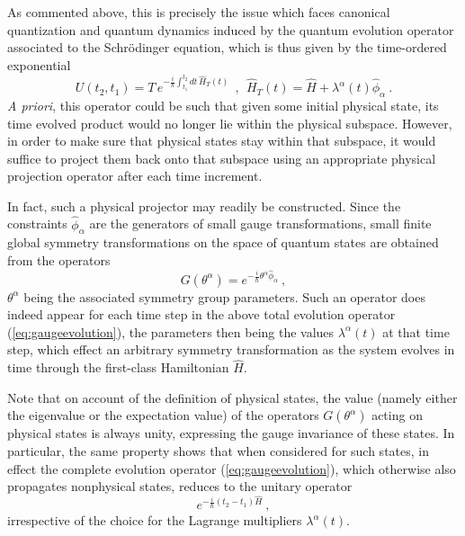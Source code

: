 \documentclass[a4paper,11pt]{article}
\begin{document}
As commented above, this is precisely the issue which faces canonical 
quantization and quantum dynamics induced by the quantum evolution 
ope\-ra\-tor associated to the Schr\"odinger equation, which is thus given 
by the time-ordered exponential
\begin{equation}
U(t_2,t_1)=T\,e^{-\frac{i}{\hbar}\int_{t_1}^{t_2}dt\,\hat{H}_T(t)}\ \ ,\ \ 
\hat{H}_T(t)=\hat{H}+\lambda^\alpha(t)\hat{\phi}_\alpha\ .
\label{eq:gaugeevolution}
\end{equation}
{\sl A priori\/}, this operator could be such that given some initial physical
state, its time evolved product would no longer lie within the physical 
subspace. However, in order to make sure that physical states stay within
that subspace, it would suffice to project them back onto that subspace
using an appropriate physical projection operator after each time 
increment.\cite{Klaud1}

In fact, such a physical projector may readily be constructed.\cite{Klaud1} 
Since the constraints $\hat{\phi}_\alpha$ are the generators of small gauge
transformations, small finite global symmetry transformations on the space 
of quantum states are obtained from the operators
\begin{equation}
G(\theta^\alpha)=e^{-\frac{i}{\hbar}\theta^\alpha\hat{\phi}_\alpha}\ ,
\label{eq:symmetryG}
\end{equation}
$\theta^\alpha$ being the associated symmetry group parameters.
Such an operator does indeed appear for each time step in the above
total evolution operator (\ref{eq:gaugeevolution}), the parameters
then being the values $\lambda^\alpha(t)$ at that time step, which
effect an arbitrary symmetry transformation as the system evolves in time
through the first-class Hamiltonian $\hat{H}$.

Note that on account of the definition of physical states, the value
(namely either the eigenvalue or the expectation value) of the operators
$G(\theta^\alpha)$ acting on physical states is always unity, expressing
the gauge invariance of these states. In particular, the same property
shows that when considered for such states, in effect the complete
evolution operator (\ref{eq:gaugeevolution}), which otherwise also propagates
nonphysical states, reduces to the unitary operator
\begin{equation}
e^{-\frac{i}{\hbar}(t_2-t_1)\hat{H}}\ ,
\end{equation}
irrespective of the choice for the Lagrange multipliers $\lambda^\alpha(t)$.
\end{document}
